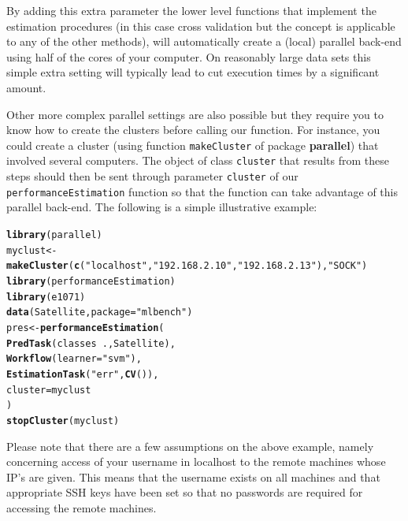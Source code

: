 \documentclass[10pt,a4paper]{article}\usepackage[]{graphicx}\usepackage[]{color}
\makeatletter
\newcommand{\hlstr}[1]{\textcolor[rgb]{0.192,0.494,0.8}{#1}}%
\newcommand{\hlopt}[1]{\textcolor[rgb]{0,0,0}{#1}}%
\newcommand{\hlstd}[1]{\textcolor[rgb]{0.345,0.345,0.345}{#1}}%
\newcommand{\hlkwb}[1]{\textcolor[rgb]{0.69,0.353,0.396}{#1}}%
\newcommand{\hlkwc}[1]{\textcolor[rgb]{0.333,0.667,0.333}{#1}}%
\newcommand{\hlkwd}[1]{\textcolor[rgb]{0.737,0.353,0.396}{\textbf{#1}}}%
\newenvironment{kframe}{%
 \def\at@end@of@kframe{}%
 \ifinner\ifhmode%
  \def\at@end@of@kframe{\end{minipage}}%
  \begin{minipage}{\columnwidth}%
 \fi\fi%
 \def\FrameCommand##1{\hskip\@totalleftmargin \hskip-\fboxsep
 \colorbox{shadecolor}{##1}\hskip-\fboxsep
     \hskip-\linewidth \hskip-\@totalleftmargin \hskip\columnwidth}%
 \MakeFramed {\advance\hsize-\width
   \@totalleftmargin\z@ \linewidth\hsize
   \@setminipage}}%
 {\par\unskip\endMakeFramed%
 \at@end@of@kframe}
\newenvironment{knitrout}{}{} %
\makeatother
\begin{document}
By adding this extra parameter the lower level functions that implement the estimation procedures (in this case cross validation but the concept is applicable to any of the other methods), will automatically create a (local) parallel back-end using half of the cores of your computer. On reasonably large data sets this simple extra setting will typically lead to cut execution times by a significant amount. 

Other more complex parallel settings are also possible but they require you to know how to create the clusters before calling our function. For instance, you could create a cluster (using function \texttt{makeCluster} of package \textbf{parallel}) that involved several computers. The object of class \texttt{cluster} that results from these steps should then be sent through parameter \texttt{cluster} of our \texttt{performanceEstimation} function so that the function can take advantage of this parallel back-end. The following is a simple illustrative example:

\begin{knitrout}\small
{}\color{fgcolor}\begin{kframe}
\begin{alltt}
\hlkwd{library}\hlstd{(parallel)}
\hlstd{myclust} \hlkwb{<-} \hlkwd{makeCluster}\hlstd{(}\hlkwd{c}\hlstd{(}\hlstr{"localhost"}\hlstd{,}\hlstr{"192.168.2.10"}\hlstd{,}\hlstr{"192.168.2.13"}\hlstd{),}\hlstr{"SOCK"}\hlstd{)}
\hlkwd{library}\hlstd{(performanceEstimation)}
\hlkwd{library}\hlstd{(e1071)}
\hlkwd{data}\hlstd{(Satellite,}\hlkwc{package}\hlstd{=}\hlstr{"mlbench"}\hlstd{)}
\hlstd{pres} \hlkwb{<-} \hlkwd{performanceEstimation}\hlstd{(}
    \hlkwd{PredTask}\hlstd{(classes} \hlopt{~} \hlstd{.,Satellite),}
    \hlkwd{Workflow}\hlstd{(}\hlkwc{learner}\hlstd{=}\hlstr{"svm"}\hlstd{),}
    \hlkwd{EstimationTask}\hlstd{(}\hlstr{"err"}\hlstd{,}\hlkwd{CV}\hlstd{()),}
    \hlkwc{cluster}\hlstd{=myclust}
    \hlstd{)}
\hlkwd{stopCluster}\hlstd{(myclust)}
\end{alltt}
\end{kframe}
\end{knitrout}

Please note that there are a few assumptions on the above example, namely concerning access of your username in localhost to the remote machines whose IP's are given. This means that the username exists on all machines and that appropriate SSH keys have been set so that no passwords are required for accessing the remote machines.
\end{document}
